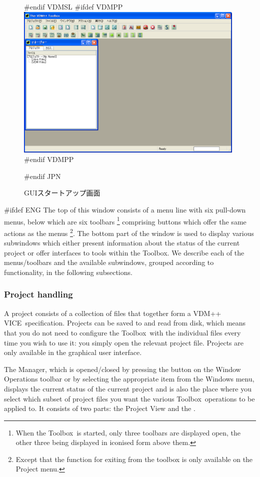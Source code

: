 \documentclass[\pformat,12pt]{article}
\newcommand{\vdmslpp}{VDM-SL}
\newcommand{\Toolbox}{Toolbox}
\newcommand{\vdmslpp}{VDM++}
\newcommand{\Toolbox}{Toolbox}
\renewcommand{\vdmslpp}{VDM++ VICE}
\newcommand{\guicmd}[1]{{\sf #1}}
\newcommand{\guicmd}[1]{{\gt #1}}
\begin{document}
\begin{figure}[tbh]
\begin{center}
#endif VDMSL
#ifdef VDMPP
\includegraphics[width=11cm]{startgui-pp.png}
#endif VDMPP
\caption{GUIスタートアップ画面}
#endif JPN
\label{fig:startgui2}
\end{center}
\end{figure}

#ifdef ENG
The top of this window consists of a menu line with six pull-down
menus, below which are six toolbars \footnote{When the \Toolbox\ is
  started, only three toolbars are displayed open, the other three
  being displayed in iconised form above them.} comprising buttons
which offer the same actions as the menus \footnote{Except that the
  function for exiting from the toolbox is only available on the
  \guicmd{Project} menu.}. The bottom part of the window is used to
display various subwindows which either present information about the
status of the current project or offer interfaces to tools within the
\Toolbox. We describe each of the menus/toolbars and the available
subwindows, grouped according to functionality, in the following
subsections.

\subsubsection{Project handling}
A project consists of a collection of files that together form a
\vdmslpp\ specification. Projects can be saved to and read from disk,
which means that you do not need to configure the \Toolbox\ with the
individual files every time you wish to use it: you simply
open the relevant project file. Projects are only available in the
graphical user interface.

The \guicmd{Manager}, which is opened/closed by
pressing the 
button on the \guicmd{Window Operations} toolbar or by
selecting the appropriate item from the \guicmd{Windows} menu,
displays the current status of the current
project and is also  the place where you select which subset of
project files you want the various \Toolbox\ operations to be applied
to. It consists of two parts: the \guicmd{Project View} and the
\ifthenelse{\boolean{VDMsl}}{\guicmd{Module View}}{\guicmd{Class
      View}}.
\end{document}
